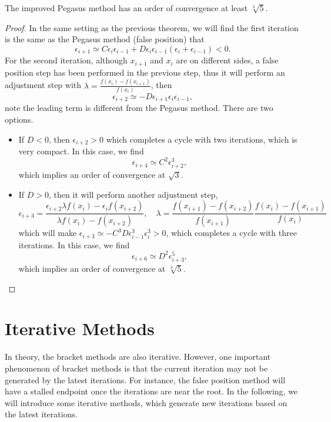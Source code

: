 \begin{theorem}
The improved Pegasus method has an order of convergence at least $\sqrt[3]{5}$.
\end{theorem}
\begin{proof}
In the same setting as the previous theorem, we will find the first iteration is the same as the Pegasus method (false position) that
$$\epsilon_{i+1}\simeq C \epsilon_i \epsilon_{i-1} + D \epsilon_i \epsilon_{i-1}(\epsilon_{i} + \epsilon_{i-1}) < 0.$$
For the second iteration, although $x_{i+1}$ and $x_{i}$ are on different sides, a false position step has been performed in the previous step, thus it will perform an adjustment step with $\lambda = \frac{f(x_{i}) - f(x_{i+1})}{f(x_{i})}$, then
$$\epsilon_{i+2} \simeq -D \epsilon_{i+1}\epsilon_{i}\epsilon_{i-1},$$
note the leading term is different from the Pegasus method. There are two options.
\begin{itemize}
    \item If $D < 0$, then $\epsilon_{i+2} > 0$ which completes a cycle with two iterations, which is very compact. In this case, we find
    $$\epsilon_{i+4} \simeq C^{2}  \epsilon_{i+2}^3,$$
    which implies an order of convergence at $\sqrt{3}$.
    \item If $D > 0$, then it will perform another adjustment step,
    $$\epsilon_{i+3} =  \frac{\epsilon_{i+2}\lambda f(x_i) - \epsilon_i f(x_{i+2})}{\lambda f(x_{i}) - f(x_{i+2})},\quad \lambda = \frac{f(x_{i+1})-f(x_{i+2})}{f(x_{i+1})}\frac{f(x_{i})-f(x_{i+1}) }{ f(x_{i})}$$
    which will make $\epsilon_{i+3} \simeq -C^3 D \epsilon_{i-1}^3 \epsilon_i^3 > 0$, which completes a cycle with three iterations. In this case, we find
    $$\epsilon_{i+6} \simeq D^{2}  \epsilon_{i+3}^5,$$
    which implies an order of convergence at $\sqrt[3]{5}$. 
\end{itemize}
\end{proof}

\section{Iterative Methods}
\label{Sec: 0-IT-ME}
In theory, the bracket methods are also iterative. However, one important phenomenon of bracket methods is that the current iteration may not be generated by the latest iterations. For instance, the false position method will have a stalled endpoint once the iterations are near the root. In the following, we will introduce some iterative methods, which generate new iterations based on the latest iterations.

